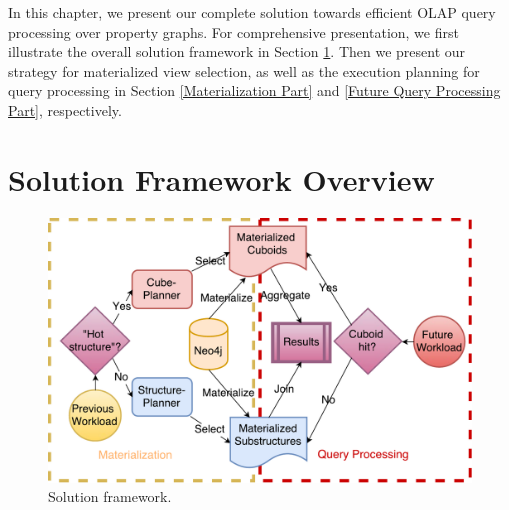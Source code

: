 
In this chapter, we present our complete solution towards efficient OLAP query processing over property graphs. For comprehensive presentation, we first illustrate the overall solution framework in Section \ref{s:4.1}. Then we present our strategy for materialized view selection, as well as the execution planning for query processing in Section \ref{Materialization Part} and \ref{Future Query Processing Part}, respectively.



\section{Solution Framework Overview}
\label{s:4.1}

\begin{figure}[H]
	\centering
	\includegraphics[scale=0.5]{pic/frame.pdf}
	\caption{Solution framework.}
	\label{Solution framework}
\end{figure}

